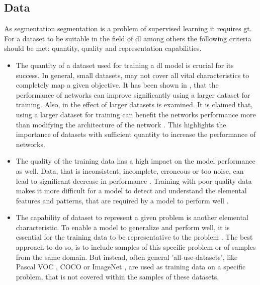 \subsection{Data}\label{ord:ch2:sec2:subsec4}
As segmentation segmentation is a problem of supervised learning it requires \gls{gt}.
For a dataset to be suitable in the field of \gls{dl} among others the following criteria should be met: quantity, quality and representation capabilities.
\begin{itemize}
	\item The quantity of a dataset used for training a \gls{dl} model is crucial for its success.
	In general, small datasets, may not cover all vital characteristics to completely map a given objective.
	It has been shown in \cite{Banko01-ScalingData}, that the performance of networks can improve significantly using a larger dataset for training.
	Also, in \cite{Halevy09-UnreasonableEffectivenessOfData} the effect of larger datasets is examined. 
	It is claimed that, using a larger dataset for training can benefit the networks performance more than modifying the architecture of the network \cite{Ger17-HandsOn}.
	This highlights the importance of datasets with sufficient quantity to increase the performance of networks.
	\item The quality of the training data has a high impact on the model performance as well.
	Data, that is inconsistent, incomplete, erroneous or too noise, can lead to significant decrease in performance \cite{Gudivada2017-DataQuality}.
	Training with poor quality data makes it more difficult for a model to detect and understand the elemental features and patterns, that are required by a model to perform well \cite{Ger17-HandsOn}.
	\item The capability of dataset to represent a given problem is another elemental characteristic.
	To enable a model to generalize and perform well, it is essential for the training data to be representative to the problem \cite{Ger17-HandsOn}.
	The best approach to do so, is to include samples of this specific problem or of samples from the same domain.	
	But instead, often general 'all-use-datasets', like Pascal VOC \cite{Eve20-PascalVOC}, COCO \cite{Lin14-Coco} or ImageNet \cite{Deng09-ImageNet}, are used as training data on a specific problem, that is not covered within the samples of these datasets.

\end{itemize}
